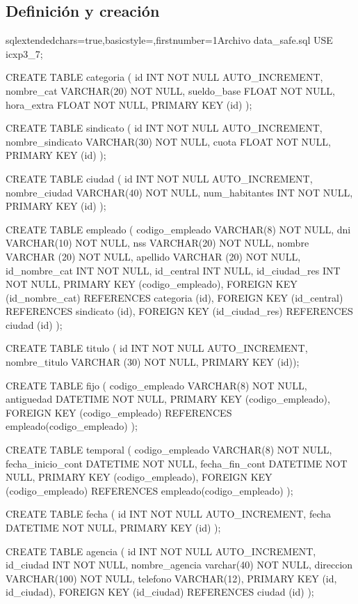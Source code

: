 	\subsection{Definición y creación}
	\begin{sourcecodep}[]{sql}{extendedchars=true,basicstyle={\fontsize{10}{10}\selectfont\ttfamily},firstnumber=1}{Archivo data\_safe.sql}
		USE icxp3_7;
		
		CREATE TABLE categoria (
		id INT NOT NULL AUTO_INCREMENT,
		nombre_cat VARCHAR(20) NOT NULL,
		sueldo_base FLOAT NOT NULL,
		hora_extra FLOAT NOT NULL,
		PRIMARY KEY (id) );
		
		CREATE TABLE sindicato (
		id INT NOT NULL AUTO_INCREMENT,
		nombre_sindicato VARCHAR(30) NOT NULL,
		cuota FLOAT NOT NULL,
		PRIMARY KEY (id) );
		
		CREATE TABLE ciudad (
		id INT NOT NULL AUTO_INCREMENT,
		nombre_ciudad VARCHAR(40) NOT NULL,
		num_habitantes INT NOT NULL,
		PRIMARY KEY (id) );
		
		CREATE TABLE empleado (
		codigo_empleado VARCHAR(8) NOT NULL,
		dni VARCHAR(10) NOT NULL,
		nss VARCHAR(20) NOT NULL,
		nombre VARCHAR (20) NOT NULL,
		apellido VARCHAR (20) NOT NULL,
		id_nombre_cat INT NOT NULL,
		id_central INT NULL,
		id_ciudad_res INT NOT NULL,
		PRIMARY KEY (codigo_empleado),
		FOREIGN KEY (id_nombre_cat) REFERENCES categoria (id),
		FOREIGN KEY (id_central) REFERENCES sindicato (id),
		FOREIGN KEY (id_ciudad_res) REFERENCES ciudad (id) );
		
		CREATE TABLE titulo (
		id INT NOT NULL AUTO_INCREMENT,
		nombre_titulo VARCHAR (30) NOT NULL,
		PRIMARY KEY (id));
		
		CREATE TABLE fijo (
		codigo_empleado VARCHAR(8) NOT NULL,
		antiguedad DATETIME NOT NULL,
		PRIMARY KEY (codigo_empleado),
		FOREIGN KEY (codigo_empleado) REFERENCES empleado(codigo_empleado) );
		
		CREATE TABLE temporal (
		codigo_empleado VARCHAR(8) NOT NULL,
		fecha_inicio_cont DATETIME NOT NULL,
		fecha_fin_cont DATETIME NOT NULL,
		PRIMARY KEY (codigo_empleado),
		FOREIGN KEY (codigo_empleado) REFERENCES empleado(codigo_empleado) );
		
		CREATE TABLE fecha (
		id INT NOT NULL AUTO_INCREMENT,
		fecha DATETIME NOT NULL,
		PRIMARY KEY (id) );
		
		CREATE TABLE agencia (
		id INT NOT NULL AUTO_INCREMENT,
		id_ciudad INT NOT NULL,
		nombre_agencia varchar(40) NOT NULL,
		direccion VARCHAR(100) NOT NULL,
		telefono VARCHAR(12),
		PRIMARY KEY (id, id_ciudad),
		FOREIGN KEY (id_ciudad) REFERENCES ciudad (id) );
		

\end{sourcecodep}
